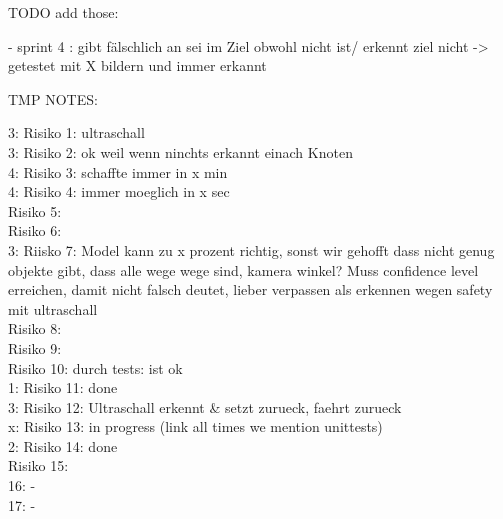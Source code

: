 TODO add those:

  - sprint 4 : gibt fälschlich an sei im Ziel obwohl nicht ist/ erkennt ziel nicht -> getestet mit X bildern und immer erkannt

TMP NOTES:

3: Risiko 1: ultraschall \\
3: Risiko 2: ok weil wenn ninchts erkannt einach Knoten \\
4: Risiko 3: schaffte immer in x min \\
4: Risiko 4: immer moeglich in x sec \\
Risiko 5:\\
Risiko 6:\\
3: Riisko 7: Model kann zu x prozent richtig, sonst wir gehofft dass nicht genug objekte gibt, dass alle wege wege sind, kamera winkel? Muss confidence level erreichen, damit nicht falsch deutet, lieber verpassen als erkennen wegen safety mit ultraschall\\
Risiko 8:\\
Risiko 9:\\
Risiko 10: durch tests: ist ok\\
1: Risiko 11: done\\
3: Risiko 12: Ultraschall erkennt \& setzt zurueck, faehrt zurueck\\
x: Risiko 13: in progress (link all times we mention unittests)\\
2: Risiko 14: done\\
Risiko 15:\\
16: -\\
17: -\\

